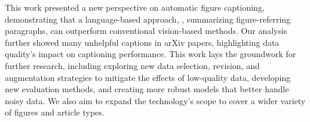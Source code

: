 This work presented a new perspective on automatic figure captioning, demonstrating that a language-based approach, \ie, summarizing figure-referring paragraphs, can outperform conventional vision-based methods.
Our analysis further showed many unhelpful captions in arXiv papers, highlighting data quality's impact on captioning performance.
%
This work lays the groundwork for further research, including exploring new data selection, revision, and augmentation strategies to mitigate the effects of low-quality data, developing new evaluation methods, and creating more robust models that better handle noisy data.
We also aim to expand the technology's scope to cover a wider variety of figures and article types.

